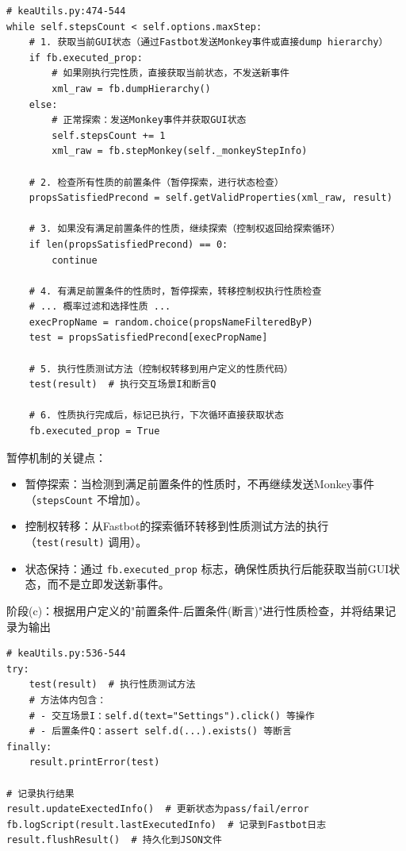 \documentclass[a4paper, zihao=-4]{ctexart}
\newcommand{\bff}[1]{{\heiti #1}}
\begin{document}
\begin{lstlisting}
# keaUtils.py:474-544
while self.stepsCount < self.options.maxStep:
    # 1. 获取当前GUI状态（通过Fastbot发送Monkey事件或直接dump hierarchy）
    if fb.executed_prop:
        # 如果刚执行完性质，直接获取当前状态，不发送新事件
        xml_raw = fb.dumpHierarchy()
    else:
        # 正常探索：发送Monkey事件并获取GUI状态
        self.stepsCount += 1
        xml_raw = fb.stepMonkey(self._monkeyStepInfo)
    
    # 2. 检查所有性质的前置条件（暂停探索，进行状态检查）
    propsSatisfiedPrecond = self.getValidProperties(xml_raw, result)
    
    # 3. 如果没有满足前置条件的性质，继续探索（控制权返回给探索循环）
    if len(propsSatisfiedPrecond) == 0:
        continue
    
    # 4. 有满足前置条件的性质时，暂停探索，转移控制权执行性质检查
    # ... 概率过滤和选择性质 ...
    execPropName = random.choice(propsNameFilteredByP)
    test = propsSatisfiedPrecond[execPropName]
    
    # 5. 执行性质测试方法（控制权转移到用户定义的性质代码）
    test(result)  # 执行交互场景I和断言Q
    
    # 6. 性质执行完成后，标记已执行，下次循环直接获取状态
    fb.executed_prop = True
\end{lstlisting}

\bff{暂停机制的关键点}：
\begin{itemize}
    \item \bff{暂停探索}：当检测到满足前置条件的性质时，不再继续发送Monkey事件（\texttt{stepsCount} 不增加）。
    \item \bff{控制权转移}：从Fastbot的探索循环转移到性质测试方法的执行（\texttt{test(result)} 调用）。
    \item \bff{状态保持}：通过 \texttt{fb.executed\_prop} 标志，确保性质执行后能获取当前GUI状态，而不是立即发送新事件。
\end{itemize}

\bff{阶段(c)：根据用户定义的"前置条件-后置条件(断言)"进行性质检查，并将结果记录为输出}

\begin{lstlisting}
# keaUtils.py:536-544
try:
    test(result)  # 执行性质测试方法
    # 方法体内包含：
    # - 交互场景I：self.d(text="Settings").click() 等操作
    # - 后置条件Q：assert self.d(...).exists() 等断言
finally:
    result.printError(test)

# 记录执行结果
result.updateExectedInfo()  # 更新状态为pass/fail/error
fb.logScript(result.lastExecutedInfo)  # 记录到Fastbot日志
result.flushResult()  # 持久化到JSON文件
\end{lstlisting}
\end{document}
